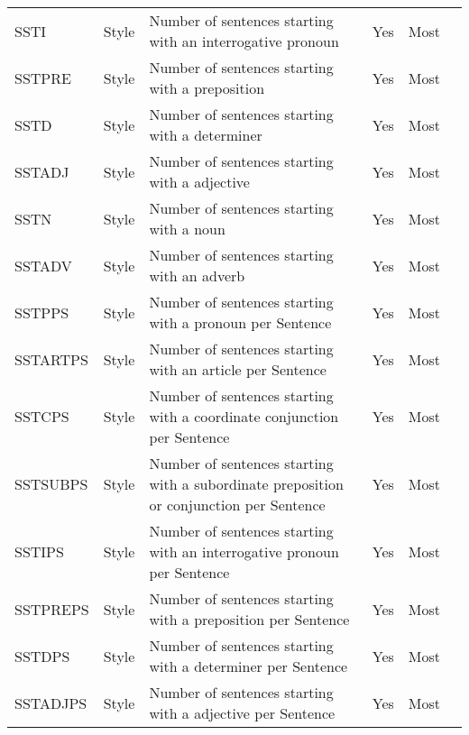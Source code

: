 \begin{longtable}{l l m{} c c m{}}
    SSTI & Style & Number of sentences starting with an interrogative pronoun & Yes & Most & \cite{Dalip2009_lr14, Wang2020_lr26, Wang2019_lr74, Dalip2011_lr1003, Dalip2014_lr1004, Magalhaes2019_lr2028} \\
    SSTPRE & Style & Number of sentences starting with a preposition & Yes & Most & \cite{Dalip2009_lr14, Wang2020_lr26, Dalip2011_lr1003, Dalip2014_lr1004, Magalhaes2019_lr2028} \\
    SSTD & Style & Number of sentences starting with a determiner & Yes & Most & \cite{Bassani2019_lr359} \\
    SSTADJ & Style & Number of sentences starting with a adjective & Yes & Most & \cite{Bassani2019_lr359} \\
    SSTN & Style & Number of sentences starting with a noun & Yes & Most & \cite{Bassani2019_lr359} \\
    SSTADV & Style & Number of sentences starting with an adverb & Yes & Most & \cite{Bassani2019_lr359} \\
    SSTPPS & Style & Number of sentences starting with a pronoun per Sentence & Yes & Most & \cite{Anderka2012_lr17, Ferretti2012_lr115, Pereyra2019_lr147, Bassani2019_lr359} \\
    SSTARTPS & Style & Number of sentences starting with an article per Sentence & Yes & Most & \cite{Anderka2012_lr17, Ferretti2012_lr115, Pereyra2019_lr147, Bassani2019_lr359} \\
    SSTCPS & Style & Number of sentences starting with a coordinate conjunction per Sentence & Yes & Most & \cite{Anderka2012_lr17, Ferretti2012_lr115, Pereyra2019_lr147, Bassani2019_lr359} \\
    SSTSUBPS & Style & Number of sentences starting with a subordinate preposition or conjunction per Sentence & Yes & Most & \cite{Anderka2012_lr17, Ferretti2012_lr115, Pereyra2019_lr147, Bassani2019_lr359} \\
    SSTIPS & Style & Number of sentences starting with an interrogative pronoun per Sentence & Yes & Most & \cite{Anderka2012_lr17, Ferretti2012_lr115, Pereyra2019_lr147} \\
    SSTPREPS & Style & Number of sentences starting with a preposition per Sentence & Yes & Most & \cite{Anderka2012_lr17, Ferretti2012_lr115, Pereyra2019_lr147} \\
    SSTDPS & Style & Number of sentences starting with a determiner per Sentence & Yes & Most & \cite{Bassani2019_lr359} \\
    SSTADJPS & Style & Number of sentences starting with a adjective per Sentence & Yes & Most & \cite{Bassani2019_lr359} \\

\end{longtable}

